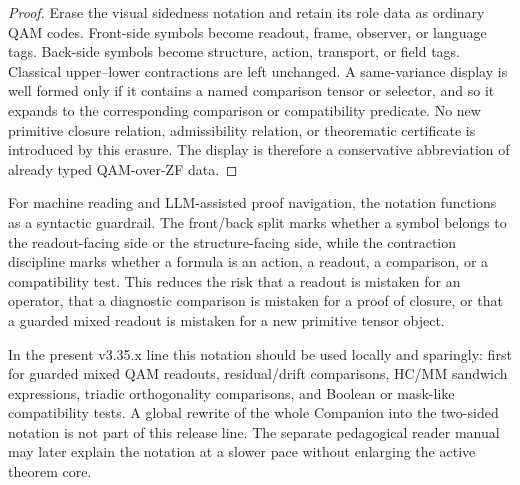 \begin{proof}
Erase the visual sidedness notation and retain its role data as ordinary QAM codes.  Front-side symbols become readout, frame, observer, or language tags.  Back-side symbols become structure, action, transport, or field tags.  Classical upper--lower contractions are left unchanged.  A same-variance display is well formed only if it contains a named comparison tensor or selector, and so it expands to the corresponding comparison or compatibility predicate.  No new primitive closure relation, admissibility relation, or theorematic certificate is introduced by this erasure.  The display is therefore a conservative abbreviation of already typed QAM-over-ZF data.
\end{proof}

\begin{remark}\label{rem:two-sided-llm-role-stability}
For machine reading and LLM-assisted proof navigation, the notation functions as a syntactic guardrail.  The front/back split marks whether a symbol belongs to the readout-facing side or the structure-facing side, while the contraction discipline marks whether a formula is an action, a readout, a comparison, or a compatibility test.  This reduces the risk that a readout is mistaken for an operator, that a diagnostic comparison is mistaken for a proof of closure, or that a guarded mixed readout is mistaken for a new primitive tensor object.
\end{remark}

\begin{remark}\label{rem:two-sided-present-release-use}
In the present v3.35.x line this notation should be used locally and sparingly: first for guarded mixed QAM readouts, residual/drift comparisons, HC/MM sandwich expressions, triadic orthogonality comparisons, and Boolean or mask-like compatibility tests.  A global rewrite of the whole Companion into the two-sided notation is not part of this release line.  The separate pedagogical reader manual may later explain the notation at a slower pace without enlarging the active theorem core.
\end{remark}


%

